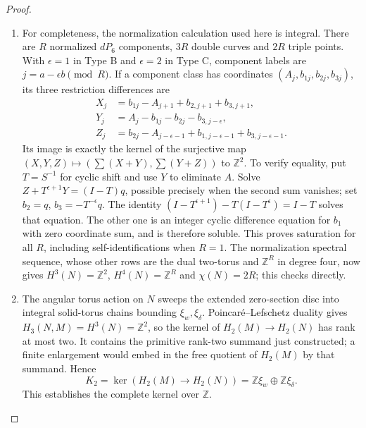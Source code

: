 \begin{proof}
\begin{enumerate}[label=\arabic*.,leftmargin=*]
\item For completeness, the normalization calculation used here is
integral. There are $R$ normalized $dP_6$ components, $3R$ double
curves and $2R$ triple points. With $\epsilon=1$ in Type B and
$\epsilon=2$ in Type C, component labels are
$j=a-\epsilon b\pmod R$. If a component class has coordinates
$(A_j,b_{1j},b_{2j},b_{3j})$, its three restriction differences are
\[
 \begin{split}
 X_j&=b_{1j}-A_{j+1}+b_{2,j+1}+b_{3,j+1},\\
 Y_j&=A_j-b_{1j}-b_{2j}-b_{3,j-\epsilon},\\
 Z_j&=b_{2j}-A_{j-\epsilon-1}
                  +b_{1,j-\epsilon-1}+b_{3,j-\epsilon-1}.
 \end{split}
\]
Its image is exactly the kernel of the surjective map
$(X,Y,Z)\mapsto(\sum(X+Y),\sum(Y+Z))$ to $\mathbb Z^2$.
To verify equality, put $T=S^{-1}$ for cyclic shift and use $Y$
to eliminate $A$. Solve
$Z+T^{\epsilon+1}Y=(I-T)q$, possible precisely when the second
sum vanishes; set $b_2=q$, $b_3=-T^{-\epsilon}q$.
The identity
$(I-T^{\epsilon+1})-T(I-T^\epsilon)=I-T$ solves that equation.
The other one is an integer cyclic difference equation for $b_1$
with zero coordinate sum, and is therefore soluble.
This proves saturation for all $R$, including self-identifications
when $R=1$. The normalization spectral sequence, whose other
rows are the dual two-torus and $\mathbb Z^R$ in degree four,
now gives $H^3(N)=\mathbb Z^2$, $H^4(N)=\mathbb Z^R$ and
$\chi(N)=2R$; this checks \cite[Theorem 7.8]{manYang26} directly.

\item The angular torus action on $N$ sweeps the extended zero-section
disc into integral solid-torus chains bounding $\xi_w,\xi_\delta$.
Poincar\'e--Lefschetz duality gives
$H_3(N,M)=H^3(N)=\mathbb Z^2$, so the kernel of
$H_2(M)\to H_2(N)$ has rank at most two. It contains the primitive
rank-two summand just constructed; a finite enlargement would
embed in the free quotient of $H_2(M)$ by that summand.
Hence
\[
 K_2=\ker(H_2(M)\to H_2(N))
       =\mathbb Z\xi_w\oplus\mathbb Z\xi_\delta.
\]
This establishes the complete kernel over $\mathbb Z$.


\end{enumerate}
\end{proof}
